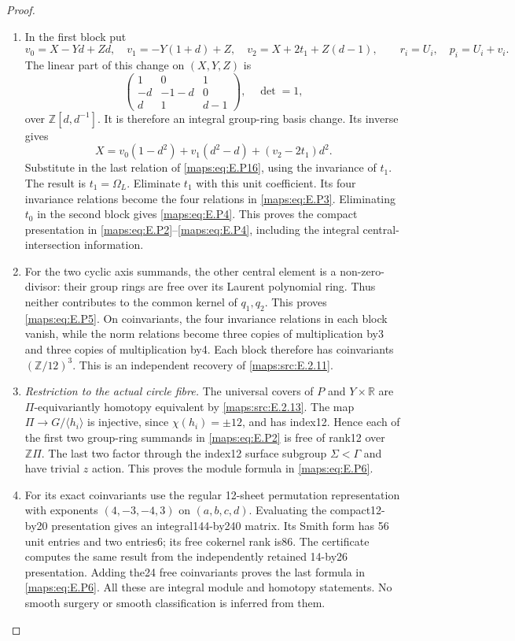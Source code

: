 \begin{proof}
\begin{enumerate}[label=\arabic*.,leftmargin=*]
\item In the first block put
\[
 v_0=X-Yd+Zd,\quad v_1=-Y(1+d)+Z,
 \quad v_2=X+2t_1+Z(d-1),\qquad
 r_i=U_i,\quad p_i=U_i+v_i.
 \tag{E.P17}\label{maps:eq:E.P17}
\]
The linear part of this change on $(X,Y,Z)$ is
\[
 \begin{pmatrix}1&0&1\\-d&-1-d&0\\d&1&d-1\end{pmatrix},
 \quad\det=1,
\]
over $\mathbb Z[d,d^{-1}]$. It is therefore an
integral group-ring basis change. Its inverse gives
\[
 X=v_0(1-d^2)+v_1(d^2-d)+(v_2-2t_1)d^2.
\]
Substitute in the last relation of \eqref{maps:eq:E.P16}, using
the invariance of $t_1$. The result is
$t_1=\Omega_L$. Eliminate $t_1$ with this unit
coefficient. Its four invariance relations become
the four relations in \eqref{maps:eq:E.P3}. Eliminating $t_0$
in the second block gives \eqref{maps:eq:E.P4}. This proves the
compact presentation in \eqref{maps:eq:E.P2}--\eqref{maps:eq:E.P4}, including
the integral central-intersection information.

\item For the two cyclic axis summands, the other
central element is a non-zero-divisor: their
group rings are free over its Laurent polynomial
ring. Thus neither contributes to the common
kernel of $q_1,q_2$. This proves \eqref{maps:eq:E.P5}. On
coinvariants, the four invariance relations in
each block vanish, while the norm relations
become three copies of multiplication by3 and
three copies of multiplication by4. Each block
therefore has coinvariants $(\mathbb Z/12)^3$.
This is an independent recovery of \ref{maps:src:E.2.11}.

\item \emph{Restriction to the actual circle fibre.}
The universal covers of $P$ and $Y\times\mathbb R$
are $\Pi$-equivariantly homotopy equivalent by
\ref{maps:src:E.2.13}. The map $\Pi\to G/\langle h_i\rangle$
is injective, since $\chi(h_i)=\pm12$, and has
index12. Hence each of the first two group-ring
summands in \eqref{maps:eq:E.P2} is free of rank12 over
$\mathbb Z\Pi$. The last two factor through the
index12 surface subgroup $\Sigma<\Gamma$ and
have trivial $z$ action. This proves the module
formula in \eqref{maps:eq:E.P6}.

\item For its exact coinvariants use the regular
12-sheet permutation representation with
exponents $(4,-3,-4,3)$ on $(a,b,c,d)$.
Evaluating the compact12-by20 presentation gives
an integral144-by240 matrix. Its Smith form has
56 unit entries and two entries6; its free
cokernel rank is86. The certificate computes
the same result from the independently retained
14-by26 presentation. Adding the24 free
coinvariants proves the last formula in \eqref{maps:eq:E.P6}.
All these are integral module and homotopy
statements. No smooth surgery or smooth
classification is inferred from them.
\end{enumerate}
\end{proof}


